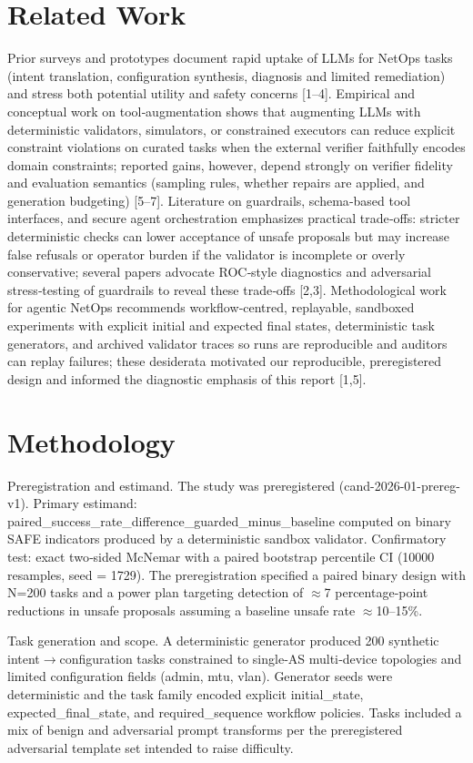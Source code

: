 \documentclass[conference]{IEEEtran}
\begin{document}
\section{Related Work}
Prior surveys and prototypes document rapid uptake of LLMs for NetOps tasks (intent translation, configuration synthesis, diagnosis and limited remediation) and stress both potential utility and safety concerns [1--4]. Empirical and conceptual work on tool‑augmentation shows that augmenting LLMs with deterministic validators, simulators, or constrained executors can reduce explicit constraint violations on curated tasks when the external verifier faithfully encodes domain constraints; reported gains, however, depend strongly on verifier fidelity and evaluation semantics (sampling rules, whether repairs are applied, and generation budgeting) [5--7]. Literature on guardrails, schema‑based tool interfaces, and secure agent orchestration emphasizes practical trade‑offs: stricter deterministic checks can lower acceptance of unsafe proposals but may increase false refusals or operator burden if the validator is incomplete or overly conservative; several papers advocate ROC‑style diagnostics and adversarial stress‑testing of guardrails to reveal these trade‑offs [2,3]. Methodological work for agentic NetOps recommends workflow‑centred, replayable, sandboxed experiments with explicit initial and expected final states, deterministic task generators, and archived validator traces so runs are reproducible and auditors can replay failures; these desiderata motivated our reproducible, preregistered design and informed the diagnostic emphasis of this report [1,5].

\section{Methodology}
Preregistration and estimand. The study was preregistered (cand-2026-01-prereg-v1). Primary estimand: paired\_success\_rate\_difference\_guarded\_minus\_baseline computed on binary SAFE indicators produced by a deterministic sandbox validator. Confirmatory test: exact two‑sided McNemar with a paired bootstrap percentile CI (10000 resamples, seed = 1729). The preregistration specified a paired binary design with N=200 tasks and a power plan targeting detection of \ensuremath{\approx}7 percentage‑point reductions in unsafe proposals assuming a baseline unsafe rate \ensuremath{\approx}10--15\%.

Task generation and scope. A deterministic generator produced 200 synthetic intent\ensuremath{\rightarrow}configuration tasks constrained to single‑AS multi‑device topologies and limited configuration fields (admin, mtu, vlan). Generator seeds were deterministic and the task family encoded explicit initial\_state, expected\_final\_state, and required\_sequence workflow policies. Tasks included a mix of benign and adversarial prompt transforms per the preregistered adversarial template set intended to raise difficulty.
\end{document}
